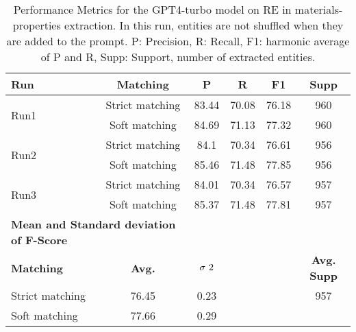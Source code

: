 \begin{table}[htbp]
    \small
    \centering
    \caption{Performance Metrics for the GPT4-turbo model on RE in materials-properties extraction. In this run, entities are not shuffled when they are added to the prompt. P: Precision, R: Recall, F1: harmonic average of P and R, Supp: Support, number of extracted entities.}
    \begin{tabular}{lccccc}
        \toprule
        \textbf{Run} & \textbf{Matching} & \textbf{P} & \textbf{R} & \textbf{F1} & \textbf{Supp}\\
        \midrule
        \multirow{2}{*}{Run1} & Strict matching & 83.44 & 70.08 & 76.18 & 960 \\
        & Soft matching & 84.69 & 71.13 & 77.32 & 960 \\
        \midrule
        \multirow{2}{*}{Run2} & Strict matching & 84.1 & 70.34 & 76.61 & 956 \\
        & Soft matching & 85.46 & 71.48 & 77.85 & 956 \\
        \midrule
        \multirow{2}{*}{Run3} & Strict matching & 84.01 & 70.34 & 76.57 & 957 \\
        & Soft matching & 85.37 & 71.48 & 77.81 & 957 \\
        \midrule
        \multicolumn{2}{l}{\textbf{Mean and Standard deviation of F-Score}} & & & & \\
        \midrule
        \textbf{Matching} & \textbf{Avg.} & $\sigma\textsuperscript{2}$ & & & \textbf{Avg. Supp}\\
        Strict matching & 76.45 & 0.23 & & & 957 \\
        Soft matching & 77.66 & 0.29 & & \\
        \bottomrule
    \end{tabular}
\end{table}


